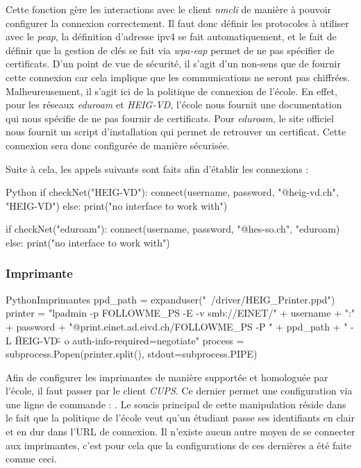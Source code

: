 Cette fonction gère les interactions avec le client \textit{nmcli} de manière à pouvoir configurer la connexion correctement.
Il faut donc définir les protocoles à utiliser avec le \textit{peap}, la définition d'adresse ipv4 se fait automatiquement, et le fait de définir que la gestion de clés se fait via \textit{wpa-eap} permet de ne pas spécifier de certificats.
\newline
D'un point de vue de sécurité, il s'agit d'un non-sens que de fournir cette connexion car cela implique que les communications ne seront pas chiffrées.
Malheureusement, il s'agit ici de la politique de connexion de l'école.
En effet, pour les réseaux \textit{eduroam} et \textit{HEIG-VD}, l'école nous fournit une documentation qui nous spécifie de ne pas fournir de certificats.
Pour \textit{eduroam}, le site officiel nous fournit un script d'installation qui permet de retrouver un certificat.
Cette connexion sera donc configurée de manière sécurisée.

Suite à cela, les appels suivants sont faits afin d'établir les connexions :

\begin{listingsbox}{Python}{}
if checkNet("HEIG-VD"):
	connect(username, password, "@heig-vd.ch", "HEIG-VD")
else:
	print("no interface to work with")

if checkNet("eduroam"):
	connect(username, password, "@hes-so.ch", "eduroam)
else:
	print("no interface to work with")
\end{listingsbox}

\subsubsection{Imprimante}

\begin{listingsbox}{Python}{Imprimantes}
ppd_path = expanduser("~/driver/HEIG_Printer.ppd")
printer = "lpadmin -p FOLLOWME_PS -E -v smb://EINET/" + username + ":" +
 password + "@print.einet.ad.eivd.ch/FOLLOWME_PS -P " + 
 ppd_path + " -L \"HEIG-VD\" - o auth-info-required=negotiate"
process = subprocess.Popen(printer.split(), stdout=subprocess.PIPE)
\end{listingsbox}

Afin de configurer les imprimantes de manière supportée et homologuée par l'école, il faut passer par le client \textit{CUPS}.
Ce dernier permet une configuration via une ligne de commande : .
Le soucis principal de cette manipulation réside dans le fait que la politique de l'école veut qu'un étudiant passe ses identifiants en clair et en dur dans l'URL de connexion.
Il n'existe aucun autre moyen de se connecter aux imprimantes, c'est pour cela que la configurations de ces dernières a été faite comme ceci.

